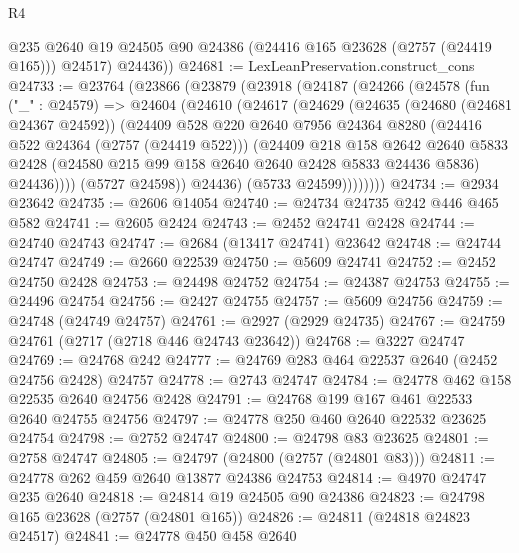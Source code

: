 \begin{lexlean}{R4}
\begin{coremodule}
          @235
          @2640
          @19
          @24505
          @90
          @24386
          (@24416 @165 @23628 (@2757 (@24419 @165)))
          @24517)
        @24436))
@24681 := LexLeanPreservation.construct_cons
@24733 := @23764
    (@23866
      (@23879
        (@23918
          (@24187
            (@24266
              (@24578
                (fun ("_" : @24579) =>
                @24604
                  (@24610
                    (@24617
                      (@24629
                        (@24635
                          (@24680 (@24681 @24367 @24592))
                          (@24409
                            @528
                            @220
                            @2640
                            @7956
                            @24364
                            @8280
                            (@24416 @522 @24364 (@2757 (@24419 @522)))
                            (@24409
                              @218
                              @158
                              @2642
                              @2640
                              @5833
                              @2428
                              (@24580 @215 @99 @158 @2640 @2640 @2428 @5833 @24436 @5836)
                              @24436))))
                      (@5727 @24598))
                    @24436)
                  (@5733 @24599))))))))
@24734 := @2934 @23642
@24735 := @2606 @14054
@24740 := @24734 @24735 @242 @446 @465 @582
@24741 := @2605 @2424
@24743 := @2452 @24741 @2428
@24744 := @24740 @24743
@24747 := @2684 (@13417 @24741) @23642
@24748 := @24744 @24747
@24749 := @2660 @22539
@24750 := @5609 @24741
@24752 := @2452 @24750 @2428
@24753 := @24498 @24752
@24754 := @24387 @24753
@24755 := @24496 @24754
@24756 := @2427 @24755
@24757 := @5609 @24756
@24759 := @24748 (@24749 @24757)
@24761 := @2927 (@2929 @24735)
@24767 := @24759 @24761 (@2717 (@2718 @446 @24743 @23642))
@24768 := @3227 @24747
@24769 := @24768 @242
@24777 := @24769 @283 @464 @22537 @2640 (@2452 @24756 @2428) @24757
@24778 := @2743 @24747
@24784 := @24778 @462 @158 @22535 @2640 @24756 @2428
@24791 := @24768 @199 @167 @461 @22533 @2640 @24755 @24756
@24797 := @24778 @250 @460 @2640 @22532 @23625 @24754
@24798 := @2752 @24747
@24800 := @24798 @83 @23625
@24801 := @2758 @24747
@24805 := @24797 (@24800 (@2757 (@24801 @83)))
@24811 := @24778 @262 @459 @2640 @13877 @24386 @24753
@24814 := @4970 @24747 @235 @2640
@24818 := @24814 @19 @24505 @90 @24386
@24823 := @24798 @165 @23628 (@2757 (@24801 @165))
@24826 := @24811 (@24818 @24823 @24517)
@24841 := @24778
    @450
    @458
    @2640

\end{coremodule}
\end{lexlean}

